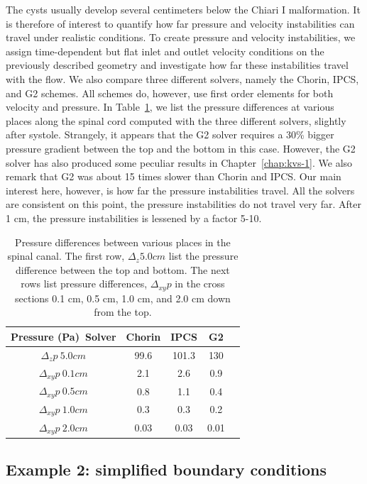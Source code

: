The cysts usually develop several centimeters below the Chiari I
malformation. It is therefore of interest to quantify how far pressure
and velocity instabilities can travel under realistic conditions.  To
create pressure and velocity instabilities, we assign time-dependent
but flat inlet and outlet velocity conditions on the previously
described geometry and investigate how far these instabilities travel
with the flow. We also compare three different solvers, namely the
Chorin, IPCS, and G2 schemes.  All schemes do, however, use first
order elements for both velocity and pressure. In
Table~\ref{solvers:pressurediff}, we list the pressure differences at
various places along the spinal cord computed with the three different
solvers, slightly after systole. Strangely, it appears that the G2
solver requires a 30\% bigger pressure gradient between the top and
the bottom in this case. However, the G2 solver has also produced some
peculiar results in Chapter~\ref{chap:kvs-1}. We also remark that G2
was about 15 times slower than Chorin and IPCS. Our main interest
here, however, is how far the pressure instabilities travel. All the
solvers are consistent on this point, the pressure instabilities do
not travel very far. After 1 cm, the pressure instabilities is
lessened by a factor 5-10.

\begin{table}
\center
\begin{tabular}{|c|c|c|c|c|} \hline
Pressure (Pa)\ Solver & Chorin & IPCS & G2 \\ \hline
$\Delta_z p \ 5.0 cm$  & 99.6 & 101.3 & 130     \\ \hline
$\Delta_{xy} p  \ 0.1 cm$  &  2.1 & 2.6 & 0.9     \\ \hline
$\Delta_{xy}  p  \ 0.5 cm$  & 0.8 & 1.1 & 0.4     \\ \hline
$\Delta_{xy}  p  \ 1.0 cm$  & 0.3 & 0.3 & 0.2     \\ \hline
$\Delta_{xy}  p  \ 2.0 cm$  &  0.03 & 0.03 & 0.01     \\ \hline
\end{tabular}
\caption{Pressure differences between various places in the spinal canal.
The first row, $\Delta_z 5.0 cm$ list the pressure difference between the
top and bottom. The next rows list pressure differences, $\Delta_{xy}
p$ in the cross sections 0.1 cm, 0.5 cm, 1.0 cm, and 2.0 cm down from
the top.}
\label{solvers:pressurediff}
\end{table}

\subsection{Example 2: simplified boundary conditions}

